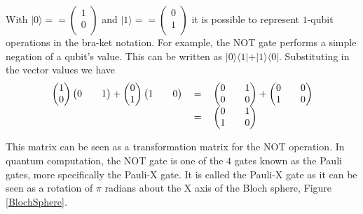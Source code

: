 \documentclass[authoryearcitations]{UoYCSproject}
\begin{document}
With
$\vert
0
\rangle
== 
\begin {pmatrix}
1\\
0\\
\end{pmatrix}
$
and
$\vert
1
\rangle
==  
\begin {pmatrix}
0\\
1\\
\end{pmatrix}
$
it is possible to represent $1$-qubit operations in the bra-ket notation.
For example, the NOT gate performs a simple negation of a qubit's value.
This can be written as $\vert0\rangle\langle1\vert + \vert1\rangle\langle0\vert$.
Substituting in the vector values we have
\begin{equation}
\begin{tabular}{ r c l }
\(\begin {pmatrix}
1\\
0
\end{pmatrix}
\begin {pmatrix}
0&&
1
\end{pmatrix}
 + 
\begin {pmatrix}
0\\
1
\end{pmatrix}
\begin {pmatrix}
1&&
0
\end{pmatrix}\)
& \(=\)
& \( 
\begin{pmatrix}
0 && 1 \\
0 && 0
\end{pmatrix}
 + 
\begin{pmatrix}
0 && 0\\
1 && 0
\end{pmatrix}
\) \\
& \(=\)
& \( 
\begin{pmatrix}
0 && 1 \\
1 && 0
\end{pmatrix}
\)
\end{tabular}
\end{equation}

This matrix can be seen as a transformation matrix for the NOT operation.
In quantum computation, the NOT gate is one of the $4$ gates known as the Pauli gates, more specifically the Pauli-X gate.
It is called the Pauli-X gate as it can be seen as a rotation of $\pi$ radians about the X axis of the Bloch sphere, Figure \ref{BlochSphere}.
\end{document}
